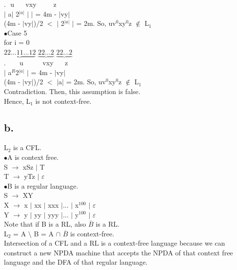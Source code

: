 \documentclass[12pt]{article}
\begin{document}
.$\hspace{8pt}$u$\hspace{20pt}$vxy$\hspace{30pt}$z \\
$\vert$ a$\vert$ 2$^{|a|}$ $\vert$ $\vert$ = 4m - $\vert$vy$\vert$ \\
(4m - $\vert$vy$\vert$)/2 $<$ $\vert$ 2$^{|a|}$ $\vert$ = 2m. So, uv$^0$xy$^0$z $\notin$ L$_1$ \\
$\bullet$Case 5 \\
for i = 0 \\
$\underbrace{22...11...12}$ $\underbrace{22...2}$ $\underbrace{22...2}$ \\
.$\hspace{24pt}$u$\hspace{34pt}$vxy$\hspace{20pt}$z \\
$\vert$ a$^R$2$^{|a|}$ $\vert$ = 4m - $\vert$vy$\vert$ \\
(4m - $\vert$vy$\vert$)/2 $<$ $\vert$a$\vert$ = 2m. So, uv$^0$xy$^0$z $\notin$ L$_1$ \\
Contradiction. Then, this assumption is false. \\
Hence, L$_1$ is not context-free. \\

\subsection*{b.}
L$_2$ is a CFL. \\
$\bullet$A is context free. \\
S $\rightarrow$ xSz $\vert$ T \\
T $\rightarrow$ yTz $\vert$ $\varepsilon$ \\
$\bullet$B is a regular language. \\
S $\rightarrow$ XY \\
X $\rightarrow$ x $\vert$ xx $\vert$ xxx $\vert$... $\vert$ x$^{100}$ $\vert$ $\varepsilon$ \\
Y $\rightarrow$ y $\vert$ yy $\vert$ yyy $\vert$... $\vert$ y$^{100}$ $\vert$ $\varepsilon$ \\
Note that if B is a RL, also $\overline{B}$ is a RL. \\
L$_2$ = A $\setminus$ B = A $\cap$ $\overline{B}$ is context-free. \\
Intersection of a CFL and a RL is a context-free language because we can construct a new NPDA machine that accepts the NPDA of that context free language and the DFA of that regular language. \\
\end{document}
